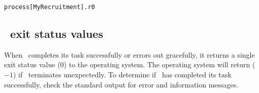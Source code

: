 \texttt{process[MyRecruitment].r0}

\subsection{\SPM\ exit status values}

When \SPM\ completes its task successfully or errors out gracefully, it returns a single exit status value ($0$) to the operating system. The operating system will return ($-1$) if \SPM\ terminates unexpectedly. To determine if \SPM\ has completed its task successfully, check the standard output for error and information messages.
